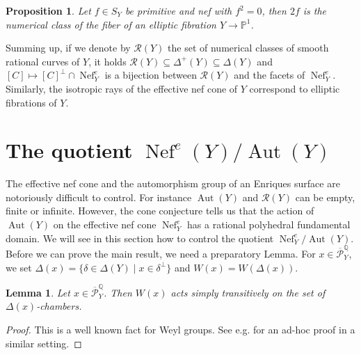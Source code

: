 \documentclass{amsart}
\theoremstyle{definition}
\theoremstyle{plain}
\newtheorem{lemma}[definition]{Lemma}
\newtheorem{proposition}[definition]{Proposition}
\DeclareMathOperator{\Nef}{Nef}
\DeclareMathOperator{\Aut}{Aut}
\renewcommand{\P}{\mathcal{P}}
\newcommand{\R}{\mathcal{R}}
\newcommand{\Pbar}{\overline{\P}^\mathbb{Q}}
\begin{document}
\begin{proposition}\cite[VIII (16.1)]{bhpv:compact-complex-surfaces} \cite[2.2.9]{cdl:enriquesI}\label{prop:class-ell-fibr}
    Let $f \in S_Y$ be primitive and nef with $f^2 = 0$, then $2f$ is the numerical class of the fiber of an elliptic fibration $Y \to \mathbb{P}^1$.
\end{proposition}

Summing up, if we denote by $\R(Y)$ the set of numerical classes of smooth rational curves of $Y$, it holds $\R(Y) \subseteq \Delta^+(Y)\subseteq \Delta(Y)$
and $[C] \mapsto [C]^\perp \cap \Nef^{e}_Y$ is a bijection between $\R(Y)$ and the facets of $\Nef^{e}_Y$.
Similarly, the isotropic rays of the effective nef cone of $Y$ correspond to elliptic fibrations of $Y$.

\section{The quotient \texorpdfstring{$\Nef^e(Y)/\Aut(Y)$}{Nef(Y)/Aut(Y)}} \label{sect:cone-conj}
The effective nef cone and the automorphism group of an Enriques surface are notoriously difficult to control. For instance $\Aut(Y)$ and $\R(Y)$ can be empty, finite or infinite. However, the cone conjecture tells us that the action of $\Aut(Y)$ on the effective nef cone $\Nef^{e}_Y$ has a rational polyhedral fundamental domain.
We will see in this section how to control the quotient $\Nef^{e}_Y/\Aut(Y)$. \\

Before we can prove the main result, we need a preparatory Lemma.
For $x \in \Pbar_Y$, we set $\Delta(x) = \{\delta \in \Delta(Y) \mid x \in \delta^\perp\}$ and $W(x) = W(\Delta(x))$.
\begin{lemma}\label{lem:transitiveDxWx}
Let $x \in \Pbar_Y$. Then $W(x)$ acts simply transitively on the set of $\Delta(x)$-chambers.
\end{lemma}
\begin{proof}
This is a well known fact for Weyl groups. See e.g. \cite[Chapter 8 Proposition 2.6]{huybrechts:k3} for an ad-hoc proof in a similar setting.
\end{proof}
\end{document}
